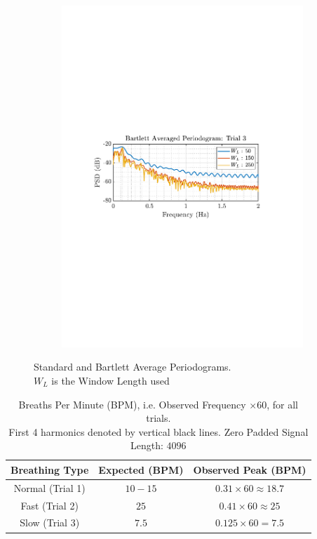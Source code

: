 \documentclass[12pt]{article}
\begin{document}
\begin{figure}[H]
\begin{subfigure}{0.49\textwidth}
			\includegraphics[trim={2.2cm 11.2cm 3.15cm  11.2cm}, clip, width=\textwidth]{../MATLAB/figures/q1_5a_fig06.pdf} 
		\end{subfigure}
		\captionsetup{justification=centering}
		\caption{Standard and Bartlett Average Periodograms. \\ $W_L$ is the Window Length used}
		\label{fig: 1-5a}
	\end{figure}

	\begin{table}[H]
		\centering
		\begin{tabular}{|c|c||c|}
			\hline
			\textbf{Breathing Type} & \textbf{Expected} (BPM) & \textbf{Observed Peak} (BPM) \\
			\hline
			\hline
			{Normal (Trial 1)} & $10-15$ & $0.31\times60\approx18.7$ \\
			\hline
			{Fast (Trial 2)} & $25$ & $0.41\times60\approx25$ \\
			\hline
			{Slow (Trial 3)} & $7.5$ & $0.125\times60=7.5$ \\
			\hline
		\end{tabular}
		\caption{Breaths Per Minute (BPM), i.e. Observed Frequency $\times 60$, for all trials. \\ First 4 harmonics denoted by vertical black lines. Zero Padded Signal Length: $4096$}
		\label{tab: 1-5a}
	\end{table}
\end{document}
